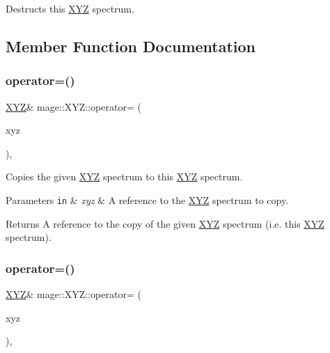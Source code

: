 Destructs this \mbox{\hyperlink{structmage_1_1_x_y_z}{X\+YZ}} spectrum. 

\subsection{Member Function Documentation}
\mbox{\label{structmage_1_1_x_y_z_a817c69124934fa9ad5d7d63b5696c939}} 
\subsubsection{\texorpdfstring{operator=()}{operator=()}\hspace{0.1cm}{\footnotesize\ttfamily [1/2]}}
{\footnotesize\ttfamily \mbox{\hyperlink{structmage_1_1_x_y_z}{X\+YZ}}\& mage\+::\+X\+Y\+Z\+::operator= (\begin{DoxyParamCaption}\item[{const \mbox{\hyperlink{structmage_1_1_x_y_z}{X\+YZ}} \&}]{xyz }\end{DoxyParamCaption})\hspace{0.3cm}{\ttfamily [default]}, {\ttfamily [noexcept]}}

Copies the given \mbox{\hyperlink{structmage_1_1_x_y_z}{X\+YZ}} spectrum to this \mbox{\hyperlink{structmage_1_1_x_y_z}{X\+YZ}} spectrum.


\begin{DoxyParams}[1]{Parameters}
\mbox{\tt in}  & {\em xyz} & A reference to the \mbox{\hyperlink{structmage_1_1_x_y_z}{X\+YZ}} spectrum to copy. \\
\hline
\end{DoxyParams}
\begin{DoxyReturn}{Returns}
A reference to the copy of the given \mbox{\hyperlink{structmage_1_1_x_y_z}{X\+YZ}} spectrum (i.\+e. this \mbox{\hyperlink{structmage_1_1_x_y_z}{X\+YZ}} spectrum). 
\end{DoxyReturn}
\mbox{\label{structmage_1_1_x_y_z_aa8b016328f6210e3b0b13cff7087dbee}} 
\subsubsection{\texorpdfstring{operator=()}{operator=()}\hspace{0.1cm}{\footnotesize\ttfamily [2/2]}}
{\footnotesize\ttfamily \mbox{\hyperlink{structmage_1_1_x_y_z}{X\+YZ}}\& mage\+::\+X\+Y\+Z\+::operator= (\begin{DoxyParamCaption}\item[{\mbox{\hyperlink{structmage_1_1_x_y_z}{X\+YZ}} \&\&}]{xyz }\end{DoxyParamCaption})\hspace{0.3cm}{\ttfamily [default]}, {\ttfamily [noexcept]}}

